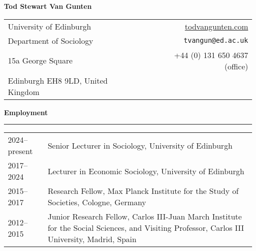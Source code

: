 \documentclass[12pt,letterpaper]{article}
\newcommand{\sectionhead}[1]{\begin{flushleft}\large\bf{#1}\vspace{.1cm}\hrule\end{flushleft}}
\begin{document}
\begin{center}
\textbf{Tod Stewart Van Gunten}\vspace{0.3cm}
\end{center}

\noindent
\begin{tabularx}{\textwidth}{@{}Xr@{}}
	University of Edinburgh & \url{todvangunten.com}\\
	Department of Sociology & \texttt{tvangun@ed.ac.uk} \\
	15a George Square & +44 (0) 131 650 4637 (office)  \\
	Edinburgh EH8 9LD, United Kingdom&\\
\end{tabularx}


\sectionhead{Employment}
\begin{tabulary}{.96\textwidth}{@{}p{2.5cm} L}
	
2024--present & Senior Lecturer in Sociology, University of Edinburgh \vspace{0.2cm}\\

2017--2024	& Lecturer in Economic Sociology, University of Edinburgh \vspace{0.2cm}\\

2015--2017 & Research Fellow, Max Planck Institute for the Study of Societies, Cologne, Germany\vspace{0.2cm}\\

2012--2015 & Junior Research Fellow, Carlos III-Juan March Institute for the Social Sciences, and Visiting Professor, Carlos III University, Madrid, Spain\vspace{0.2cm}\\


\end{tabulary}
\end{document}
